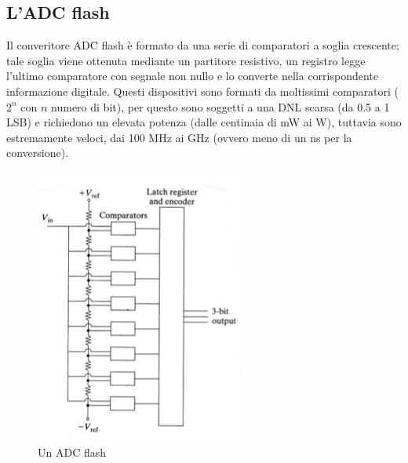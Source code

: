 \subsection{L'ADC flash}
Il converitore ADC flash \`e formato da una serie di comparatori a soglia crescente; tale soglia viene ottenuta mediante un partitore resistivo,
un registro legge l'ultimo comparatore con segnale non nullo e lo converte nella corrispondente informazione digitale.
Questi dispositivi sono formati da moltissimi comparatori ($2^n$ con $n$ numero di bit), per questo sono soggetti a una DNL scarsa (da 0.5 a 1 LSB) e richiedono un elevata potenza 
(dalle centinaia di mW ai W), tuttavia sono estremamente veloci, dai 100 MHz ai GHz (ovvero meno di un ns per la conversione).
\begin{figure}[htbp]
\begin{center}
\includegraphics[scale=1]{./Immagini/ADCFlash.png}
\caption{Un ADC flash}
\label{fig:ADCFlash}
\end{center}
\end{figure}
